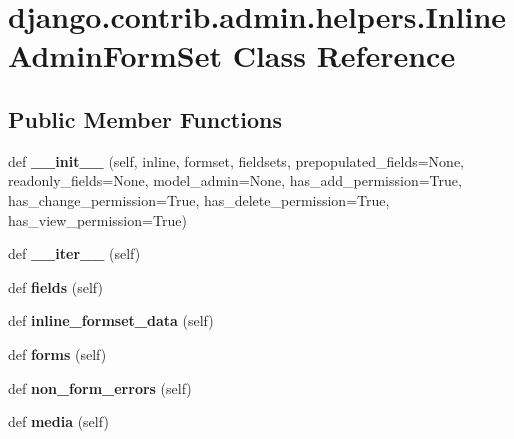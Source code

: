 \hypertarget{classdjango_1_1contrib_1_1admin_1_1helpers_1_1_inline_admin_form_set}{}\section{django.\+contrib.\+admin.\+helpers.\+Inline\+Admin\+Form\+Set Class Reference}
\label{classdjango_1_1contrib_1_1admin_1_1helpers_1_1_inline_admin_form_set}
\subsection*{Public Member Functions}
\begin{DoxyCompactItemize}
\item 
\mbox{\label{classdjango_1_1contrib_1_1admin_1_1helpers_1_1_inline_admin_form_set_a749d8126079cdb68b0deb543f07e246f}} 
def {\bfseries \+\_\+\+\_\+init\+\_\+\+\_\+} (self, inline, formset, fieldsets, prepopulated\+\_\+fields=None, readonly\+\_\+fields=None, model\+\_\+admin=None, has\+\_\+add\+\_\+permission=True, has\+\_\+change\+\_\+permission=True, has\+\_\+delete\+\_\+permission=True, has\+\_\+view\+\_\+permission=True)
\item 
\mbox{\label{classdjango_1_1contrib_1_1admin_1_1helpers_1_1_inline_admin_form_set_a94b25ab91be7d8922b8c5603ea71f898}} 
def {\bfseries \+\_\+\+\_\+iter\+\_\+\+\_\+} (self)
\item 
\mbox{\label{classdjango_1_1contrib_1_1admin_1_1helpers_1_1_inline_admin_form_set_a05da4b8d8905c6773882ad9d9219e56f}} 
def {\bfseries fields} (self)
\item 
\mbox{\label{classdjango_1_1contrib_1_1admin_1_1helpers_1_1_inline_admin_form_set_a6aa3e18fea94ee880895d7008e71a9eb}} 
def {\bfseries inline\+\_\+formset\+\_\+data} (self)
\item 
\mbox{\label{classdjango_1_1contrib_1_1admin_1_1helpers_1_1_inline_admin_form_set_a5f7dea78364630b55ad61ef019a34edc}} 
def {\bfseries forms} (self)
\item 
\mbox{\label{classdjango_1_1contrib_1_1admin_1_1helpers_1_1_inline_admin_form_set_ae13e9888b61b6c375eb05600fe787455}} 
def {\bfseries non\+\_\+form\+\_\+errors} (self)
\item 
\mbox{\label{classdjango_1_1contrib_1_1admin_1_1helpers_1_1_inline_admin_form_set_acd0deda68a575db3b93861e294836b99}} 
def {\bfseries media} (self)
\end{DoxyCompactItemize}
